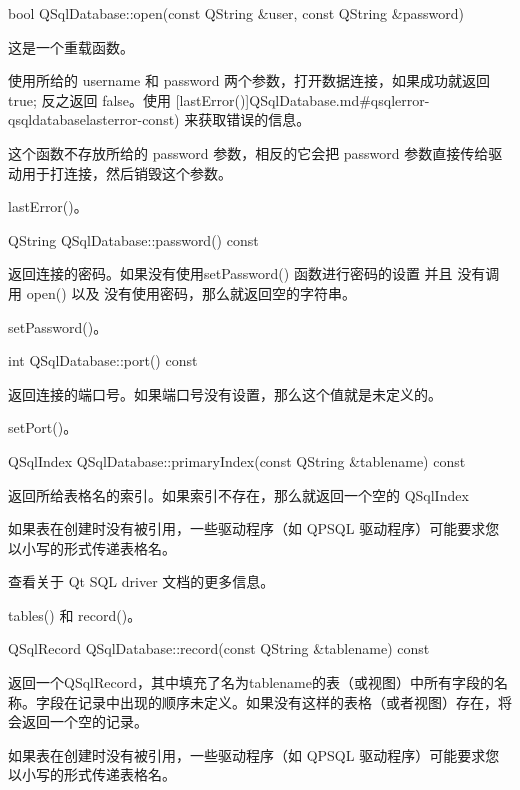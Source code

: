 bool QSqlDatabase::open(const QString \&user, const QString \&password)


这是一个重载函数。

使用所给的 username 和 password 两个参数，打开数据连接，如果成功就返回 true; 反之返回 false。使用 [lastError()]QSqlDatabase.md\#qsqlerror-qsqldatabaselasterror-const) 来获取错误的信息。

这个函数不存放所给的 password 参数，相反的它会把 password 参数直接传给驱动用于打连接，然后销毁这个参数。



\begin{notice}[另请参阅]
lastError()。
\end{notice}

QString QSqlDatabase::password() const


返回连接的密码。如果没有使用setPassword() 函数进行密码的设置 并且 没有调用 open() 以及 没有使用密码，那么就返回空的字符串。


\begin{notice}[另请参阅]
setPassword()。
\end{notice}

int QSqlDatabase::port() const


返回连接的端口号。如果端口号没有设置，那么这个值就是未定义的。

\begin{notice}[另请参阅]
setPort()。
\end{notice}

QSqlIndex QSqlDatabase::primaryIndex(const QString \&tablename) const


返回所给表格名的索引。如果索引不存在，那么就返回一个空的 QSqlIndex

\begin{notice}
如果表在创建时没有被引用，一些驱动程序（如 QPSQL 驱动程序）可能要求您以小写的形式传递表格名。
\end{notice}


查看关于 Qt SQL driver 文档的更多信息。

\begin{notice}[另请参阅]
tables() 和 record()。
\end{notice}


QSqlRecord QSqlDatabase::record(const QString \&tablename) const


返回一个QSqlRecord，其中填充了名为tablename的表（或视图）中所有字段的名称。字段在记录中出现的顺序未定义。如果没有这样的表格（或者视图）存在，将会返回一个空的记录。

\begin{notice}
如果表在创建时没有被引用，一些驱动程序（如 QPSQL 驱动程序）可能要求您以小写的形式传递表格名。
\end{notice}


